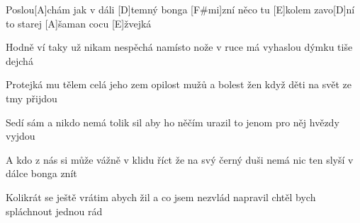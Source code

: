 
Poslou[A]chám jak v dáli [D]temný bonga [F#mi]zní
něco tu [E]kolem zavo[D]ní
to starej [A]\null šaman cocu [E]\null žvejká

Hodně ví taky už nikam nespěchá
namísto nože v ruce má
vyhaslou dýmku tiše dejchá

Protejká mu tělem celá jeho zem
opilost mužů a bolest žen
když děti na svět ze tmy přijdou

Sedí sám a nikdo nemá tolik sil
aby ho něčím urazil
to jenom pro něj hvězdy vyjdou

A kdo z nás si může vážně v klidu říct
že na svý černý duši nemá nic
ten slyší v dálce bonga znít

Kolikrát se ještě vrátim abych žil
a co jsem nezvlád napravil
chtěl bych spláchnout jednou rád
\vfill
